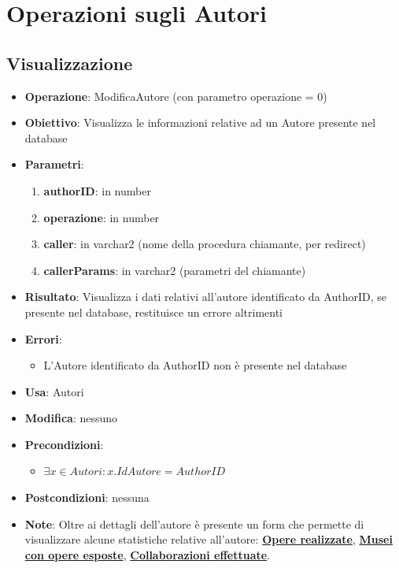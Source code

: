 \section{Operazioni sugli Autori}

\subsection{Visualizzazione}
\begin{itemize}
	\item \textbf{Operazione}: ModificaAutore (con parametro operazione = 0)
	\item \textbf{Obiettivo}: Visualizza le informazioni relative ad un Autore presente nel database
	\item \textbf{Parametri}:
	\begin{enumerate}
		\item \textbf{authorID}: in number
		\item \textbf{operazione}: in number
		\item \textbf{caller}: in varchar2 (nome della procedura chiamante, per redirect)
		\item \textbf{callerParams}: in varchar2 (parametri del chiamante)
	\end{enumerate}
	\item \textbf{Risultato}: Visualizza i dati relativi all'autore identificato da AuthorID, se presente nel database, restituisce un errore altrimenti
	\item \textbf{Errori}: 
	\begin{itemize}
		\item L'Autore identificato da AuthorID non è presente nel database
	\end{itemize}
	\item \textbf{Usa}: Autori
	\item \textbf{Modifica}: nessuno
	\item \textbf{Precondizioni}:
	\begin{itemize}
		\item $\exists x \in Autori : x.IdAutore = AuthorID$
	\end{itemize}
	\item \textbf{Postcondizioni}: nessuna
	\item \textbf{Note}: Oltre ai dettagli dell'autore è presente un form che permette di 
	visualizzare alcune statistiche relative all'autore:  \hyperref[OpereRealizzate]{\textbf{Opere realizzate}}, 
	\hyperref[MuseiOpereEsposte]{\textbf{Musei con opere esposte}},
	\hyperref[Collaborazioni]{\textbf{Collaborazioni effettuate}}.
\end{itemize}

